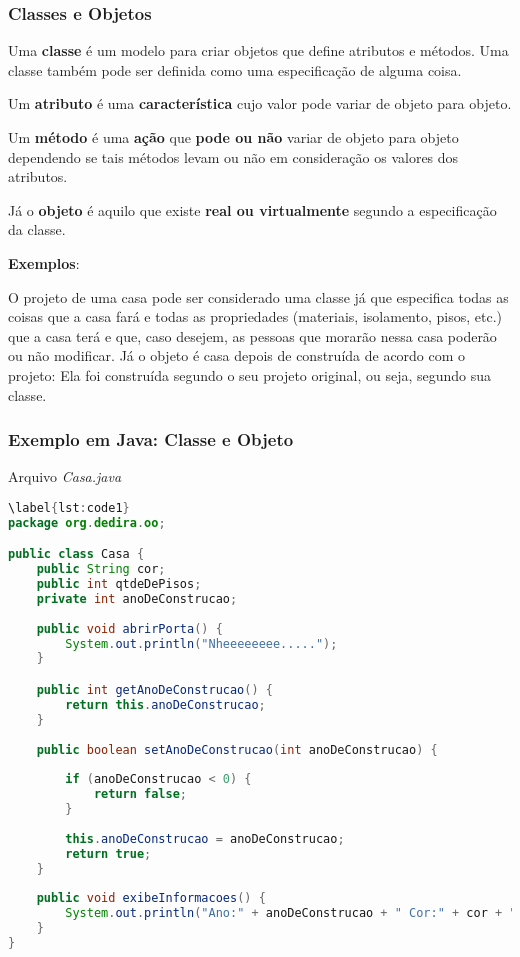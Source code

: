 \begin{frame}
	\frametitle{Classes e Objetos}
	
	\par Uma \textbf{classe} é um modelo para criar objetos que define atributos e métodos. Uma classe também pode ser definida como uma especificação de alguma coisa.
	
	\par Um \textbf{atributo} é uma \textbf{característica} cujo valor pode variar de objeto para objeto.
	
	\par Um \textbf{método} é uma \textbf{ação} que \textbf{pode ou não} variar de objeto para objeto dependendo se tais métodos levam ou não em consideração os valores dos atributos.
	
	\par Já o \textbf{objeto} é aquilo que existe \textbf{real ou virtualmente} segundo a especificação da classe.

	\par \textbf{Exemplos}:
	\par O projeto de uma casa pode ser considerado uma classe já que especifica todas as coisas que a casa fará e todas as propriedades (materiais, isolamento, pisos, etc.) que a casa terá e que, caso desejem, as pessoas que morarão nessa casa poderão ou não modificar. Já o objeto é casa depois de construída de acordo com o projeto: Ela foi construída segundo o seu projeto original, ou seja, segundo sua classe.
\end{frame}

\begin{frame}[fragile]
	\frametitle{Exemplo em Java: Classe e Objeto}
	\par Arquivo \textit{Casa.java}
	\begin{lstlisting}[language=Java]
		\label{lst:code1}
package org.dedira.oo;

public class Casa {
	public String cor;
	public int qtdeDePisos;
	private int anoDeConstrucao;
	
	public void abrirPorta() {
		System.out.println("Nheeeeeeee.....");
	}

	public int getAnoDeConstrucao() {
		return this.anoDeConstrucao;
	}
	
	public boolean setAnoDeConstrucao(int anoDeConstrucao) {
		
		if (anoDeConstrucao < 0) {
			return false;
		}
		
		this.anoDeConstrucao = anoDeConstrucao;
		return true;
	}
	
	public void exibeInformacoes() {
		System.out.println("Ano:" + anoDeConstrucao + " Cor:" + cor + " Pisos:" + qtdeDePisos);
	}
}
	\end{lstlisting}
\end{frame}

